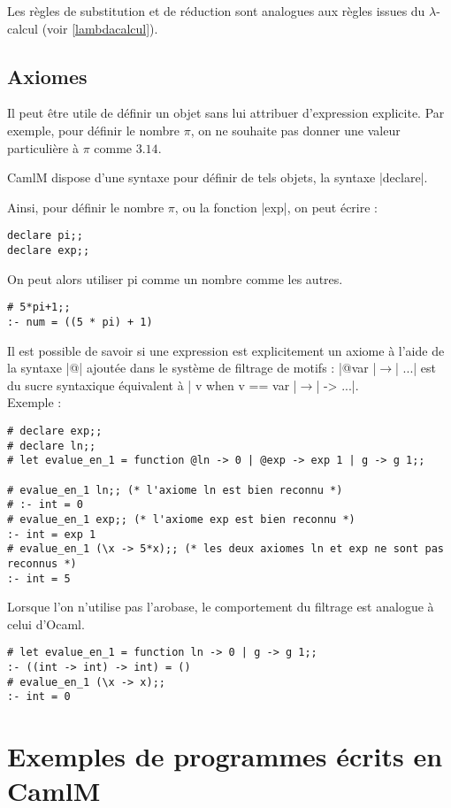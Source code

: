 \documentclass[a4paper, 12pt]{article}
\begin{document}
Les règles de substitution et de réduction sont analogues aux règles issues du $\lambda$-calcul (voir \ref{lambdacalcul}).

\subsection{Axiomes}

Il peut être utile de définir un objet sans lui attribuer d'expression explicite. Par exemple, pour définir le nombre $\pi$, on ne souhaite pas donner une valeur particulière à $\pi$ comme $3.14$.

CamlM dispose d'une syntaxe pour définir de tels objets, la syntaxe |declare|.

Ainsi, pour définir le nombre $\pi$, ou la fonction |exp|, on peut écrire :

\begin{lstlisting}
declare pi;;
declare exp;;
\end{lstlisting}
On peut alors utiliser pi comme un nombre comme les autres.
\begin{lstlisting}
# 5*pi+1;;
:- num = ((5 * pi) + 1)
\end{lstlisting}



Il est possible de savoir si une expression est explicitement un axiome à l'aide de la syntaxe |@| ajoutée dans le système de filtrage de motifs : |@var |$\rightarrow$| ...| est du sucre syntaxique équivalent à | v when v == var  |$\rightarrow$| -> ...|.\\
Exemple : 
\begin{lstlisting}
# declare exp;;
# declare ln;;
# let evalue_en_1 = function @ln -> 0 | @exp -> exp 1 | g -> g 1;;

# evalue_en_1 ln;; (* l'axiome ln est bien reconnu *)
# :- int = 0
# evalue_en_1 exp;; (* l'axiome exp est bien reconnu *)
:- int = exp 1
# evalue_en_1 (\x -> 5*x);; (* les deux axiomes ln et exp ne sont pas reconnus *)
:- int = 5
\end{lstlisting}

Lorsque l'on n'utilise pas l'arobase, le comportement du filtrage est analogue à celui d'Ocaml.
\begin{lstlisting}
# let evalue_en_1 = function ln -> 0 | g -> g 1;; 
:- ((int -> int) -> int) = ()
# evalue_en_1 (\x -> x);;
:- int = 0
\end{lstlisting}

 

\section{Exemples de programmes écrits en CamlM}
\end{document}
